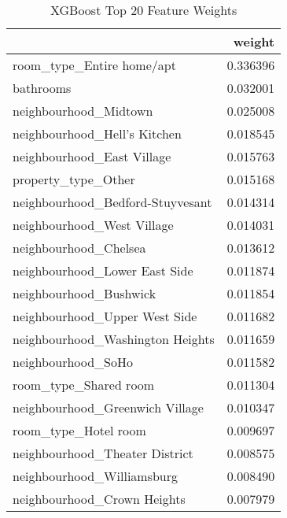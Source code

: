 \begin{table}[H]
  \centering
  \caption{XGBoost Top 20 Feature Weights}
  \label{tab:xgb-weights}
  \begin{tabular}{lr}
    \toprule
    {} &    weight \\
    \midrule
    room\_type\_Entire home/apt        &  0.336396 \\
    bathrooms                        &  0.032001 \\
    neighbourhood\_Midtown            &  0.025008 \\
    neighbourhood\_Hell's Kitchen     &  0.018545 \\
    neighbourhood\_East Village       &  0.015763 \\
    property\_type\_Other              &  0.015168 \\
    neighbourhood\_Bedford-Stuyvesant &  0.014314 \\
    neighbourhood\_West Village       &  0.014031 \\
    neighbourhood\_Chelsea            &  0.013612 \\
    neighbourhood\_Lower East Side    &  0.011874 \\
    neighbourhood\_Bushwick           &  0.011854 \\
    neighbourhood\_Upper West Side    &  0.011682 \\
    neighbourhood\_Washington Heights &  0.011659 \\
    neighbourhood\_SoHo               &  0.011582 \\
    room\_type\_Shared room            &  0.011304 \\
    neighbourhood\_Greenwich Village  &  0.010347 \\
    room\_type\_Hotel room             &  0.009697 \\
    neighbourhood\_Theater District   &  0.008575 \\
    neighbourhood\_Williamsburg       &  0.008490 \\
    neighbourhood\_Crown Heights      &  0.007979 \\
  \bottomrule
  \end{tabular}
\end{table}

